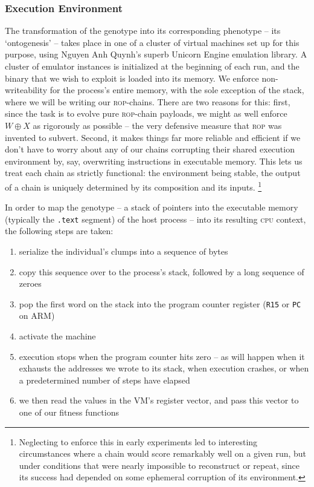 \subsubsection{Execution Environment}
The transformation of the genotype into its corresponding
phenotype -- its `ontogenesis' -- takes place in one of a cluster
of virtual machines set up for this purpose, using Nguyen Anh
Quynh's superb Unicorn Engine emulation library. A cluster of
emulator instances is initialized at the beginning of each run,
and the binary that we wish to exploit is loaded into its memory.
We enforce non-writeability for the process's entire memory, with
the sole exception of the stack, where we will be writing our
\textsc{rop}-chains. There are two reasons for this: first, since
the task is to evolve pure \textsc{rop}-chain payloads, we might
as well enforce $W \oplus X$ as rigorously as possible -- the
very defensive measure that \textsc{rop} was invented to subvert.
Second, it makes things far more reliable and efficient if we
don't have to worry about any of our chains corrupting their
shared execution environment by, say, overwriting instructions in
executable memory. This lets us treat each chain as strictly
functional: the environment being stable, the output of a chain
is uniquely determined by its composition and its inputs.%
\footnote{Neglecting to enforce this in early experiments led to
  interesting circumstances where a chain would score remarkably
  well on a given run, but under conditions that were nearly
  impossible to reconstruct or repeat, since its success had
  depended on some ephemeral corruption of its environment.}

In order to map the genotype -- a stack of pointers into the executable memory (typically the \texttt{.text} segment) of the host process -- into its resulting \textsc{cpu} context, the following steps are taken:

\begin{enumerate} 
  \item serialize the individual's clumps into a sequence of bytes
  \item copy this sequence over to the process's stack, followed by a long sequence of zeroes
  \item pop the first word on the stack into the program counter register (\texttt{R15} or \texttt{PC} on ARM)
  \item activate the machine
  \item execution stops when the program counter hits zero -- as will happen when it exhausts the addresses we wrote to its stack, when execution crashes, or when a predetermined number of steps have elapsed
  \item we then read the values in the VM's register vector, and pass this vector to one of our fitness functions
\end{enumerate}

